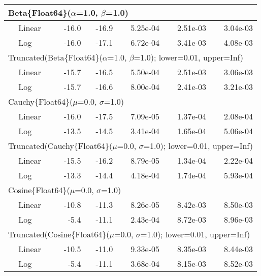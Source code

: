 \begin{tabular}{|llrrrrr|}
\hline
\multicolumn{7}{|l|}{Beta\{Float64\}($\alpha$=1.0, $\beta$=1.0)}\\ \hline
& Linear & -16.0 & -16.9 & {\color{blue}5.25e-04} & {\color{blue}2.51e-03} & {\color{blue}3.04e-03}\\
& Log & {\color{blue}-16.0} & {\color{blue}-17.1} & 6.72e-04 & 3.41e-03 & 4.08e-03\\
\hline
\multicolumn{7}{|l|}{Truncated(Beta\{Float64\}($\alpha$=1.0, $\beta$=1.0); lower=0.01, upper=Inf)}\\ \hline
& Linear & -15.7 & -16.5 & {\color{blue}5.50e-04} & 2.51e-03 & {\color{blue}3.06e-03}\\
& Log & {\color{blue}-15.7} & {\color{blue}-16.6} & 8.00e-04 & {\color{blue}2.41e-03} & 3.21e-03\\
\hline
\multicolumn{7}{|l|}{Cauchy\{Float64\}($\mu$=0.0, $\sigma$=1.0)}\\ \hline
& Linear & {\color{blue}-16.0} & {\color{blue}-17.5} & {\color{blue}7.09e-05} & {\color{blue}1.37e-04} & {\color{blue}2.08e-04}\\
& Log & -13.5 & -14.5 & 3.41e-04 & 1.65e-04 & 5.06e-04\\
\hline
\multicolumn{7}{|l|}{Truncated(Cauchy\{Float64\}($\mu$=0.0, $\sigma$=1.0); lower=0.01, upper=Inf)}\\ \hline
& Linear & {\color{blue}-15.5} & {\color{blue}-16.2} & {\color{blue}8.79e-05} & {\color{blue}1.34e-04} & {\color{blue}2.22e-04}\\
& Log & -13.3 & -14.4 & 4.18e-04 & 1.74e-04 & 5.93e-04\\
\hline
\multicolumn{7}{|l|}{Cosine\{Float64\}($\mu$=0.0, $\sigma$=1.0)}\\ \hline
& Linear & {\color{blue}-10.8} & {\color{blue}-11.3} & {\color{blue}8.26e-05} & {\color{blue}8.42e-03} & {\color{blue}8.50e-03}\\
& Log & -5.4 & -11.1 & 2.43e-04 & 8.72e-03 & 8.96e-03\\
\hline
\multicolumn{7}{|l|}{Truncated(Cosine\{Float64\}($\mu$=0.0, $\sigma$=1.0); lower=0.01, upper=Inf)}\\ \hline
& Linear & {\color{blue}-10.5} & -11.0 & {\color{blue}9.33e-05} & 8.35e-03 & {\color{blue}8.44e-03}\\
& Log & -5.4 & {\color{blue}-11.1} & 3.68e-04 & {\color{blue}8.15e-03} & 8.52e-03\\
\hline
\end{tabular}
